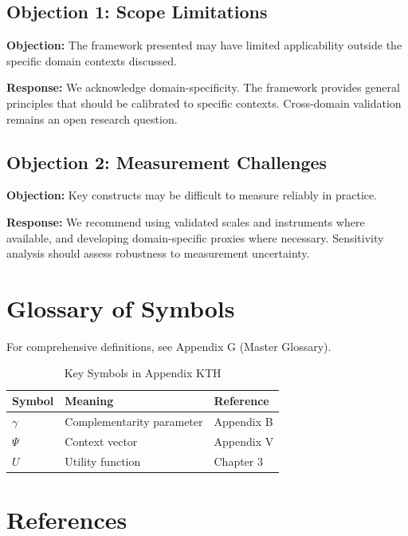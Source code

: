 \subsection{Objection 1: Scope Limitations}

\textbf{Objection:} The framework presented may have limited applicability
outside the specific domain contexts discussed.

\textbf{Response:} We acknowledge domain-specificity. The framework provides
general principles that should be calibrated to specific contexts. Cross-domain
validation remains an open research question.

\subsection{Objection 2: Measurement Challenges}

\textbf{Objection:} Key constructs may be difficult to measure reliably in
practice.

\textbf{Response:} We recommend using validated scales and instruments where
available, and developing domain-specific proxies where necessary. Sensitivity
analysis should assess robustness to measurement uncertainty.



\section{Glossary of Symbols}
\label{sec:kth-glossary}

For comprehensive definitions, see Appendix G (Master Glossary).

\begin{table}[htbp]
\centering
\caption{Key Symbols in Appendix KTH}
\begin{tabular}{lll}
\toprule
\textbf{Symbol} & \textbf{Meaning} & \textbf{Reference} \\
\midrule
$\gamma$ & Complementarity parameter & Appendix B \\
$\Psi$ & Context vector & Appendix V \\
$U$ & Utility function & Chapter 3 \\
\bottomrule
\end{tabular}
\end{table}


\section{References}
\label{sec:kth-references}

